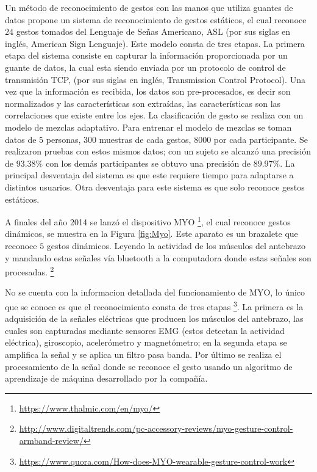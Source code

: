 Un método de reconocimiento de gestos con las manos que utiliza guantes de datos \citep{Yoon2012} propone un sistema de reconocimiento de gestos estáticos, el cual reconoce $24$ gestos tomados del Lenguaje de Señas Americano, ASL (por sus siglas en inglés, American Sign Lenguaje). Este modelo consta de tres etapas. 
La primera etapa del sistema consiste en capturar la información proporcionada por un guante de datos, la cual esta siendo enviada por un protocolo de control de transmisión TCP, (por sus siglas en inglés, Transmission Control Protocol).
Una vez que la información es recibida, los datos son pre-procesados, es decir son normalizados y las características son extraídas, las características son las correlaciones que existe entre los ejes.   
La clasificación de gesto se realiza con un modelo de mezclas adaptativo. Para entrenar el modelo de mezclas se toman datos de $5$ personas, $300$ muestras de cada gestos, $8000$ por cada participante. Se realizaron pruebas con estos mismos datos; con un sujeto se alcanzó una precisión de $93.38 \%$ con los demás participantes se obtuvo una precisión de $89.97 \%$.  
La principal desventaja del sistema es que este requiere tiempo para adaptarse a distintos usuarios. Otra desventaja para este sistema es que solo reconoce gestos estáticos. 

A finales del año 2014 se lanzó el dispositivo MYO \footnote{\url{https://www.thalmic.com/en/myo/}}, el cual reconoce gestos dinámicos, se muestra en la Figura \ref{fig:Myo}. Este aparato es un brazalete que reconoce $5$ gestos dinámicos. Leyendo la actividad de los músculos del antebrazo y mandando estas señales vía bluetooth a la computadora donde estas señales son procesadas. \footnote{\url{http://www.digitaltrends.com/pc-accessory-reviews/myo-gesture-control-armband-review/}} 

No se cuenta con la informacion detallada del funcionamiento de MYO, lo único que se conoce es que el reconocimiento consta de tres etapas \footnote{\url{https://www.quora.com/How-does-MYO-wearable-gesture-control-work}}. La primera es la adquisición de la señales eléctricas que producen los músculos del antebrazo, las cuales son capturadas mediante sensores EMG (estos detectan la actividad eléctrica), giroscopio, acelerómetro y magnetómetro; en la segunda etapa se amplifica la señal y se aplica un filtro pasa banda. Por último se realiza el procesamiento de la señal donde se reconoce el gesto usando un algoritmo de aprendizaje de máquina desarrollado por la compañía.  

